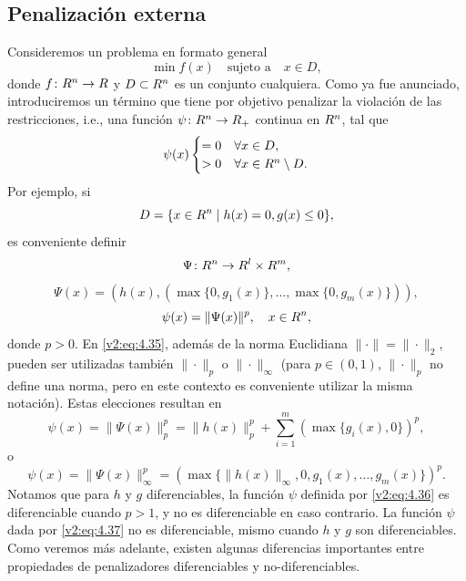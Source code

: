 \subsection{Penalización externa}\label{v2:sec:4.3.1}

Consideremos un problema en formato general
\begin{equation}
    \min f(x) \quad \text{sujeto a} \quad x \in D,
    \label{v2:eq:4.31}
\end{equation}
donde $f \colon R^n \to R$ y $D \subset R^n$ es un conjunto cualquiera. Como ya fue anunciado, introduciremos un término que tiene por objetivo penalizar la violación de las restricciones, i.e., una función $\psi \colon R^n \to R_+$ continua en $R^n$, tal que
\begin{equation}
    \psi(x) \begin{cases}
        = 0 & \forall x \in D, \\
        > 0 & \forall x \in R^n \setminus D.
    \end{cases}
    \label{v2:eq:4.32}
\end{equation}
Por ejemplo, si
\begin{equation}
    D = \{x \in R^n \mid h(x) = 0, g(x) \le 0\},
    \label{v2:eq:4.33}
\end{equation}
es conveniente definir
\[
    \Psi \colon R^n \to R^l \times R^m,
\]
\begin{equation}
    \Psi(x) = (h(x), (\max\{0, g_1(x)\}, \dots, \max\{0, g_m(x)\})),
    \label{v2:eq:4.34}
\end{equation}
\begin{equation}
    \psi(x) = \|\Psi(x)\|^p, \quad x \in R^n,
    \label{v2:eq:4.35}
\end{equation}
donde $p > 0$. En \eqref{v2:eq:4.35}, además de la norma Euclidiana $\|\cdot\| = \|\cdot\|_2$, pueden ser utilizadas también $\|\cdot\|_p$ o $\|\cdot\|_\infty$ (para $p \in (0, 1)$, $\|\cdot\|_p$ no define una norma, pero en este contexto es conveniente utilizar la misma notación). Estas elecciones resultan en
\begin{equation}
    \psi(x) = \|\Psi(x)\|_p^p = \|h(x)\|_p^p + \sum_{i=1}^m (\max\{g_i(x), 0\})^p,
    \label{v2:eq:4.36}
\end{equation}
o
\begin{equation}
    \psi(x) = \|\Psi(x)\|_\infty^p = (\max\{\|h(x)\|_\infty, 0, g_1(x), \dots, g_m(x)\})^p.
    \label{v2:eq:4.37}
\end{equation}
Notamos que para $h$ y $g$ diferenciables, la función $\psi$ definida por \eqref{v2:eq:4.36} es diferenciable cuando $p > 1$, y no es diferenciable en caso contrario. La función $\psi$ dada por \eqref{v2:eq:4.37} no es diferenciable, mismo cuando $h$ y $g$ son diferenciables. Como veremos más adelante, existen algunas diferencias importantes entre propiedades de penalizadores diferenciables y no-diferenciables.

